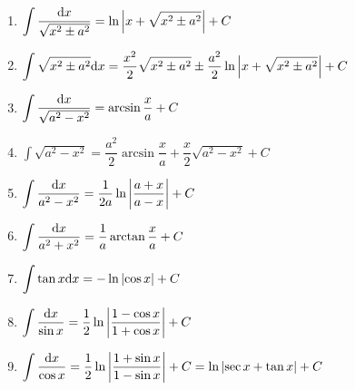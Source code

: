 \documentclass{ctexart}
\begin{document}
\begin{theorem}
    \begin{enumerate}[leftmargin=*,label=\textbf{\arabic*.\ }]
        \item $\displaystyle\int{\dfrac{\mathrm{d}x}{\sqrt{x^2\pm a^2}}}=\ln{\left|x+\sqrt{x^2\pm a^2}\right|}+C$
        \item $\displaystyle\int{\sqrt{x^2\pm a^2}\mathrm{d}x}=\dfrac{x^2}{2}\sqrt{x^2\pm a^2}\pm\dfrac{a^2}{2}\ln{\left|x+\sqrt{x^2\pm a^2}\right|}+C$
        \item $\displaystyle\int{\dfrac{\mathrm{d}x}{\sqrt{a^2-x^2}}}=\arcsin\dfrac{x}{a}+C$
        \item $\displaystyle\int{\sqrt{a^2-x^2}}=\dfrac{a^2}{2}\arcsin{\dfrac{x}{a}}+\dfrac{x}{2}\sqrt{a^2-x^2}+C$
        \item $\displaystyle\int{\dfrac{\mathrm{d}x}{a^2-x^2}}=\dfrac{1}{2a}\ln{\left|\dfrac{a+x}{a-x}\right|}+C$
        \item $\displaystyle\int{\dfrac{\mathrm{d}x}{a^2+x^2}}=\dfrac{1}{a}\arctan{\dfrac{x}{a}}+C$
        \item $\displaystyle\int{\tan x\mathrm{d}x}=-\ln{\left|\cos x\right|}+C$
        \item $\displaystyle\int{\dfrac{\mathrm{d}x}{\sin x}}=\dfrac{1}{2}\ln{\left|\dfrac{1-\cos x}{1+\cos x}\right|}+C$
        \item $\displaystyle\int{\dfrac{\mathrm{d}x}{\cos x}}=\dfrac{1}{2}\ln{\left|\dfrac{1+\sin x}{1-\sin x}\right|}+C=\ln{\left|\sec x+\tan x\right|}+C$
    \end{enumerate}
\end{theorem}
\end{document}
